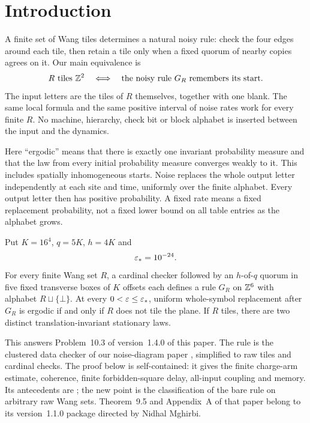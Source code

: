 \section{Introduction}\label{sec:intro}

A finite set of Wang tiles determines a natural noisy rule: check the four edges around each tile, then retain a tile only when a fixed quorum of nearby copies agrees on it. Our main equivalence is
\[
 R\text{ tiles }\mathbb{Z}^2
 \quad\Longleftrightarrow\quad
 \text{the noisy rule }G_R\text{ remembers its start}.
\]
The input letters are the tiles of $R$ themselves, together with one blank. The same local formula and the same positive interval of noise rates work for every finite $R$. No machine, hierarchy, check bit or block alphabet is inserted between the input and the dynamics.

Here ``ergodic'' means that there is exactly one invariant probability measure and that the law from every initial probability measure converges weakly to it. This includes spatially inhomogeneous starts. Noise replaces the whole output letter independently at each site and time, uniformly over the finite alphabet. Every output letter then has positive probability. A fixed rate means a fixed replacement probability, not a fixed lower bound on all table entries as the alphabet grows.

\begin{mainD}
Put $K=16^4$, $q=5K$, $h=4K$ and
\[
  \varepsilon_*=10^{-24}.
\]
For every finite Wang set $R$, a cardinal checker followed by an $h$-of-$q$ quorum in five fixed
transverse boxes of $K$ offsets each defines a rule $G_R$ on $\mathbb{Z}^6$ with alphabet
$R\sqcup\{\bot\}$. At every $0<\varepsilon\le\varepsilon_*$, uniform whole-symbol replacement after
$G_R$ is ergodic if and only if $R$ does not tile the plane. If $R$ tiles, there are two distinct
translation-invariant stationary laws.
\end{mainD}

This answers Problem~10.3 of version~1.4.0 of this paper. The rule is the clustered data checker of our noise-diagram paper \cite[Section~5]{DMdiagram}, simplified to raw tiles and cardinal checks. The proof below is self-contained: it gives the finite charge-arm estimate, coherence, finite forbidden-square delay, all-input coupling and memory. Its antecedents are \cite[Lemmas~5.1--5.3 and~8.5, Theorem~9.5 and Appendix~A]{DMdiagram}; the new point is the classification of the bare rule on arbitrary raw Wang sets. Theorem~9.5 and Appendix~A of that paper belong to its version~1.1.0 package directed by Nidhal Mghirbi.

